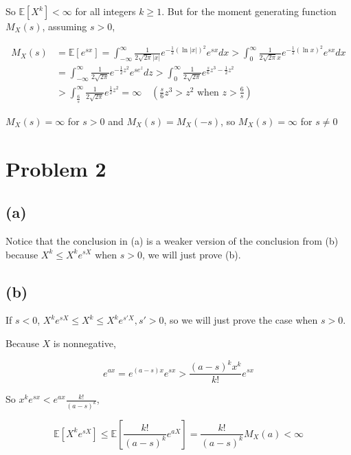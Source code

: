 \documentclass{article}
\begin{document}
So $\mathbb{E}[X^k] < \infty$ for all integers $k\geqslant 1$. But for the moment generating function $M_X(s)$, assuming $s>0$,

\begin{equation}
    \begin{aligned}
        M_X(s) & = \mathbb{E}[e^{sx}] = \int_{-\infty}^{\infty}  \frac{1}{2\sqrt{2\pi} |x|} e^{-\frac{1}{2} (\ln |x|)^2} e^{sx} dx > \int_{0}^{\infty}  \frac{1}{2\sqrt{2\pi} x} e^{-\frac{1}{2} (\ln x)^2} e^{sx} dx  \\
        & = \int_{-\infty}^{\infty}  \frac{1}{2\sqrt{2\pi} } e^{-\frac{1}{2} z^2} e^{se^z} dz > \int_{0}^{\infty} \frac{1}{2\sqrt{2\pi} } e^{\frac{s}{6} z^3-\frac{1}{2} z^2} \\
        & >  \int_{\frac{6}{s}}^{\infty} \frac{1}{2\sqrt{2\pi} } e^{\frac{1}{2} z^2} = \infty \quad (\frac{s}{6} z^3 > z^2 \text{ when } z>\frac{6}{s}) 
    \end{aligned}
\end{equation}

$M_X(s) = \infty$ for $s>0$ and $M_X(s) = M_X(-s)$, so  $M_X(s) = \infty$ for $s\neq 0$

\section{Problem 2}

\subsection{(a)}

Notice that the conclusion in (a) is a weaker version of the conclusion from (b) because $X^k \leqslant X^k e^{sX}$ when $s>0$, we will just prove (b).

\subsection{(b)}

If $s<0$, $X^k e^{sX} \leqslant X^k \leqslant X^k e^{s'X},s'>0$, so we will just prove the case when $s>0$.

Because $X$ is nonnegative,

\begin{equation}
    e^{ax} = e^{(a-s)x} e^{sx}  > \frac{(a-s)^k x^k}{k!}e^{sx}
\end{equation}

So $x^ke^{sx} < e^{ax} \frac {k!}{(a-s)^k}$,

\begin{equation}
    \mathbb{E}[X^ke^{sX}] \leqslant \mathbb{E}[\frac {k!}{(a-s)^k} e^{aX}] = \frac {k!}{(a-s)^k} M_X(a) < \infty
\end{equation}
\end{document}
